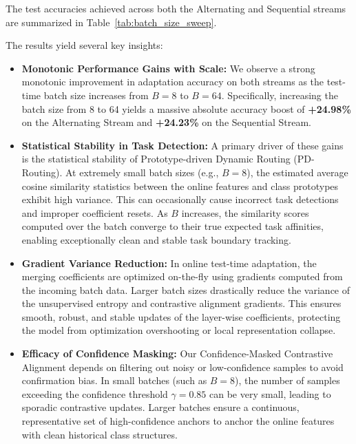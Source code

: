 \documentclass{article}
\theoremstyle{plain}
\theoremstyle{definition}
\theoremstyle{remark}
\begin{document}
The test accuracies achieved across both the Alternating and Sequential streams are summarized in Table~\ref{tab:batch_size_sweep}.

\begin{table}[h]
\centering
\caption{Sensitivity Analysis of Test-Time Batch Size $B$ (under Gaussian Noise)}
\label{tab:batch_size_sweep}
\vskip 0.1in
\begin{small}
\end{small}
\end{table}

The results yield several key insights:
\begin{itemize}
  \item \textbf{Monotonic Performance Gains with Scale:} We observe a strong monotonic improvement in adaptation accuracy on both streams as the test-time batch size increases from $B=8$ to $B=64$. Specifically, increasing the batch size from 8 to 64 yields a massive absolute accuracy boost of \textbf{+24.98\%} on the Alternating Stream and \textbf{+24.23\%} on the Sequential Stream.
  \item \textbf{Statistical Stability in Task Detection:} A primary driver of these gains is the statistical stability of Prototype-driven Dynamic Routing (PD-Routing). At extremely small batch sizes (e.g., $B=8$), the estimated average cosine similarity statistics between the online features and class prototypes exhibit high variance. This can occasionally cause incorrect task detections and improper coefficient resets. As $B$ increases, the similarity scores computed over the batch converge to their true expected task affinities, enabling exceptionally clean and stable task boundary tracking.
  \item \textbf{Gradient Variance Reduction:} In online test-time adaptation, the merging coefficients are optimized on-the-fly using gradients computed from the incoming batch data. Larger batch sizes drastically reduce the variance of the unsupervised entropy and contrastive alignment gradients. This ensures smooth, robust, and stable updates of the layer-wise coefficients, protecting the model from optimization overshooting or local representation collapse.
  \item \textbf{Efficacy of Confidence Masking:} Our Confidence-Masked Contrastive Alignment depends on filtering out noisy or low-confidence samples to avoid confirmation bias. In small batches (such as $B=8$), the number of samples exceeding the confidence threshold $\gamma=0.85$ can be very small, leading to sporadic contrastive updates. Larger batches ensure a continuous, representative set of high-confidence anchors to anchor the online features with clean historical class structures.
\end{itemize}
\end{document}
